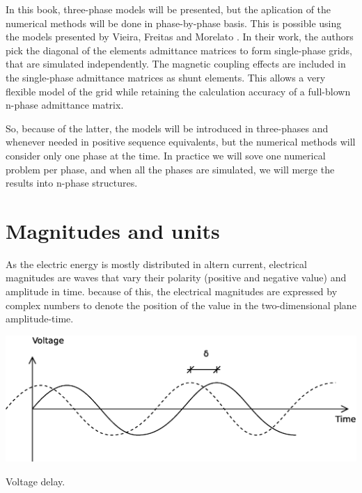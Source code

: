 \documentclass{tufte-book}
\begin{document}
In this book, three-phase models will be presented, but the aplication of the numerical methods will be done in phase-by-phase basis. This is possible using the models presented by Vieira, Freitas and Morelato \cite{vieira2004phase}. In their work, the authors pick the diagonal of the elements admittance matrices to form single-phase grids, that are simulated independently. The magnetic coupling effects are included in the single-phase admittance matrices as shunt elements. This allows a very flexible model of the grid while retaining the calculation accuracy of a full-blown n-phase admittance matrix.

So, because of the latter, the models will be introduced in three-phases and whenever needed in positive sequence equivalents, but the numerical methods will consider only one phase at the time. In practice we will sove one numerical problem per phase, and when all the phases are simulated, we will merge the results into n-phase structures.

\chapter{Magnitudes and units}



As the electric energy is mostly distributed in altern current, electrical magnitudes are waves that vary their polarity (positive and negative value) and amplitude in time. because of this, the electrical magnitudes are expressed by complex numbers to denote the position of the value in the two-dimensional plane amplitude-time. 

\begin{marginfigure}
  \includegraphics[width=\linewidth]{img/VoltageDelay.eps}
  \caption{Voltage delay.}
  \label{fig:vdelay}
\end{marginfigure}
\end{document}
